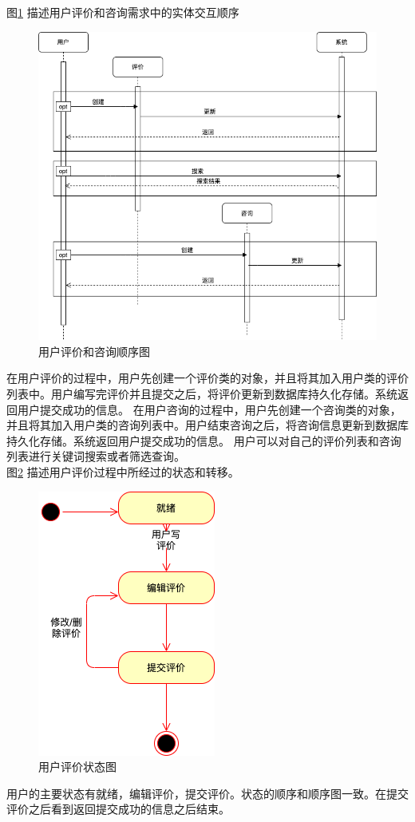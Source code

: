 \documentclass[a4paper]{ctexart}
\begin{document}
图\ref{fig:用户评价和咨询顺序图} 描述用户评价和咨询需求中的实体交互顺序
\begin{figure}[H]
\centering
\includegraphics[scale=0.45]{image/3_3顺序图.png}
\caption{用户评价和咨询顺序图}
\label{fig:用户评价和咨询顺序图}
\end{figure}
在用户评价的过程中，用户先创建一个评价类的对象，并且将其加入用户类的评价列表中。用户编写完评价并且提交之后，将评价更新到数据库持久化存储。系统返回用户提交成功的信息。
在用户咨询的过程中，用户先创建一个咨询类的对象，并且将其加入用户类的咨询列表中。用户结束咨询之后，将咨询信息更新到数据库持久化存储。系统返回用户提交成功的信息。
用户可以对自己的评价列表和咨询列表进行关键词搜索或者筛选查询。\\


图\ref{fig:用户评价状态图} 描述用户评价过程中所经过的状态和转移。

\begin{figure}[H]
\centering
\includegraphics[scale=0.5]{image/3_4状态图.png}
\caption{用户评价状态图}
\label{fig:用户评价状态图}
\end{figure}
用户的主要状态有就绪，编辑评价，提交评价。状态的顺序和顺序图一致。在提交评价之后看到返回提交成功的信息之后结束。\\
\end{document}
